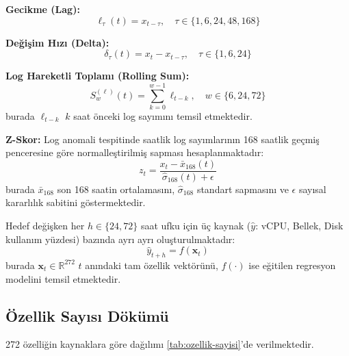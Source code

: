 \textbf{Gecikme (Lag):}
\begin{equation}
    \ell_\tau(t) = x_{t-\tau}, \quad \tau \in \{1, 6, 24, 48, 168\}
    \label{eq:lag}
\end{equation}

\textbf{Değişim Hızı (Delta):}
\begin{equation}
    \delta_\tau(t) = x_t - x_{t-\tau}, \quad \tau \in \{1, 6, 24\}
    \label{eq:delta}
\end{equation}

\textbf{Log Hareketli Toplamı (Rolling Sum):}
\begin{equation}
    S_w^{(\ell)}(t) = \sum_{k=0}^{w-1} \ell_{t-k}, \quad w \in \{6, 24, 72\}
    \label{eq:rsum}
\end{equation}
burada $\ell_{t-k}$ $k$ saat önceki log sayımını temsil etmektedir.

\textbf{Z-Skor:}
Log anomali tespitinde saatlik log sayımlarının 168 saatlik geçmiş penceresine göre normalleştirilmiş sapması hesaplanmaktadır:
\begin{equation}
    z_t = \frac{x_t - \bar{x}_{168}(t)}{\hat{\sigma}_{168}(t) + \epsilon}
    \label{eq:zscore}
\end{equation}
burada $\bar{x}_{168}$ son 168 saatin ortalamasını, $\hat{\sigma}_{168}$ standart sapmasını ve $\epsilon$ sayısal kararlılık sabitini göstermektedir.

Hedef değişken her $h \in \{24, 72\}$ saat ufku için üç kaynak ($\hat{y}$: vCPU, Bellek, Disk kullanım yüzdesi) bazında ayrı ayrı oluşturulmaktadır:
\begin{equation}
    \hat{y}_{t+h} = f(\mathbf{x}_t)
    \label{eq:hedef}
\end{equation}
burada $\mathbf{x}_t \in \mathbb{R}^{272}$ $t$ anındaki tam özellik vektörünü, $f(\cdot)$ ise eğitilen regresyon modelini temsil etmektedir.

\subsection{Özellik Sayısı Dökümü}

272 özelliğin kaynaklara göre dağılımı \autoref{tab:ozellik-sayisi}'de verilmektedir.

